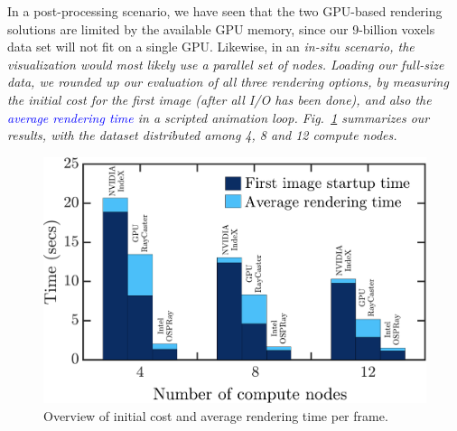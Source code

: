 \documentclass[5p,times]{elsarticle}
\begin{document}
In a post-processing scenario, we have seen that the two GPU-based
rendering solutions are limited by the available GPU memory, since our 9-billion
voxels data set will not fit on a single GPU. Likewise, in an \it{in-situ} \rm
scenario, the visualization would most likely use a parallel 
set of nodes. Loading our full-size data, we rounded up our evaluation of all
three rendering options, by measuring the initial cost
for the first image (after all I/O has been done), and also the \textcolor{blue}{average rendering time}
in a scripted animation loop. Fig.~\ref{fig:diagram} summarizes our results,
with the dataset distributed among 4, 8 and 12 compute nodes.


\begin{figure}
	\centering
	\includegraphics[width=\linewidth]{bardiagram}%
	\caption{\label{fig:diagram} Overview of initial cost and average rendering time per frame.}
\end{figure}
\end{document}
